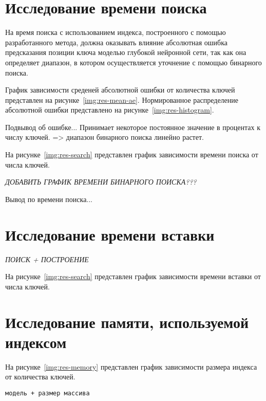 \section{Исследование времени поиска}

На время поиска с использованием индекса, построенного с помощью разработанного
метода, должна оказывать влияние абсолютная ошибка предсказания позиции ключа
моделью глубокой нейронной сети, так как она определяет диапазон, в котором
осуществляется уточнение с помощью бинарного поиска.

График зависимости среденей абсолютной ошибки от количества ключей представлен
на рисунке~\ref{img:res-mean-ae}. Нормированное распределение абсолютной ошибки
представлено на рисунке~\ref{img:res-histogram}.

Подвывод об ошибке... Принимает некоторое постоянное значение в процентах к
числу ключей. => диапазон бинарного поиска линейно растет.

На рисунке~\ref{img:res-search} представлен график зависимости времени поиска от
числа ключей.

\textit{ДОБАВИТЬ ГРАФИК ВРЕМЕНИ БИНАРНОГО ПОИСКА???}

Вывод по времени поиска...

\section{Исследование времени вставки}

\textit{ПОИСК + ПОСТРОЕНИЕ}

На рисунке~\ref{img:res-search} представлен график зависимости времени вставки
от числа ключей.

\section{Исследование памяти, используемой индексом}

На рисунке~\ref{img:res-memory} представлен график зависимости размера индекса
от количества ключей.

\texttt{модель + размер массива}

